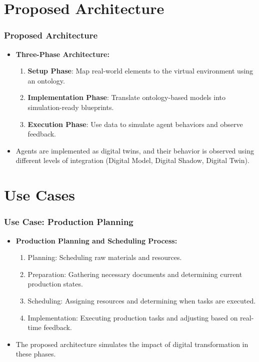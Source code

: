 \section{Proposed Architecture}

\begin{frame}
    \frametitle{Proposed Architecture}
    \begin{itemize}
        \item \textbf{Three-Phase Architecture:}
        \begin{enumerate}
            \item \textbf{Setup Phase}: Map real-world elements to the virtual environment using an ontology.
            \item \textbf{Implementation Phase}: Translate ontology-based models into simulation-ready blueprints.
            \item \textbf{Execution Phase}: Use data to simulate agent behaviors and observe feedback.
        \end{enumerate}
        \item Agents are implemented as digital twins, and their behavior is observed using different levels of integration (Digital Model, Digital Shadow, Digital Twin).
    \end{itemize}
\end{frame}

\section{Use Cases}

\begin{frame}
    \frametitle{Use Case: Production Planning}
    \begin{itemize}
        \item \textbf{Production Planning and Scheduling Process:}
        \begin{enumerate}
            \item Planning: Scheduling raw materials and resources.
            \item Preparation: Gathering necessary documents and determining current production states.
            \item Scheduling: Assigning resources and determining when tasks are executed.
            \item Implementation: Executing production tasks and adjusting based on real-time feedback.
        \end{enumerate}
        \item The proposed architecture simulates the impact of digital transformation in these phases.
    \end{itemize}
\end{frame}

